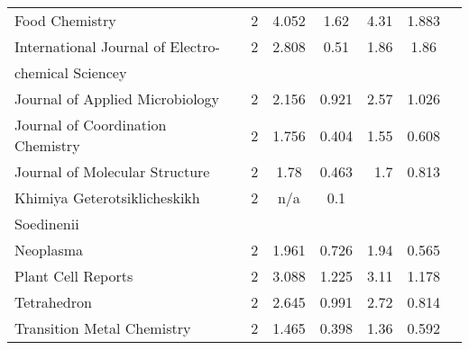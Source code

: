 \begin{longtable}[c]{lcccrcc}
 Food Chemistry                                                                     & 2      & 4.052   & 1.62  &  4.31      & 1.883                 \\[0.5ex]
 International Journal of Electro-                                                  & 2      & 2.808   & 0.51  &  1.86      & 1.86                  \\[0.5ex]
 chemical Sciencey                                                                  &        &         &       &            &                       \\[0.5ex]
 Journal of Applied Microbiology                                                    & 2      & 2.156   & 0.921 &  2.57      & 1.026                 \\[0.5ex]
 Journal of Coordination Chemistry                                                  & 2      & 1.756   & 0.404 &  1.55      & 0.608                 \\[0.5ex]
 Journal of Molecular Structure                                                     & 2      & 1.78    & 0.463 &  1.7       & 0.813                 \\[0.5ex]
 Khimiya Geterotsiklicheskikh                                                       & 2      & n/a     & 0.1   &            &                       \\[0.5ex]
 Soedinenii                                                                         &        &         &       &            &                       \\[0.5ex]
 Neoplasma                                                                          & 2      & 1.961   & 0.726 &  1.94      & 0.565                 \\[0.5ex]
 Plant Cell Reports                                                                 & 2      & 3.088   & 1.225 &  3.11      & 1.178                 \\[0.5ex]
 Tetrahedron                                                                        & 2      & 2.645   & 0.991 &  2.72      & 0.814                 \\[0.5ex]
 Transition Metal Chemistry                                                         & 2      & 1.465   & 0.398 &  1.36      & 0.592                 \\[0.5ex]
\end{longtable}

